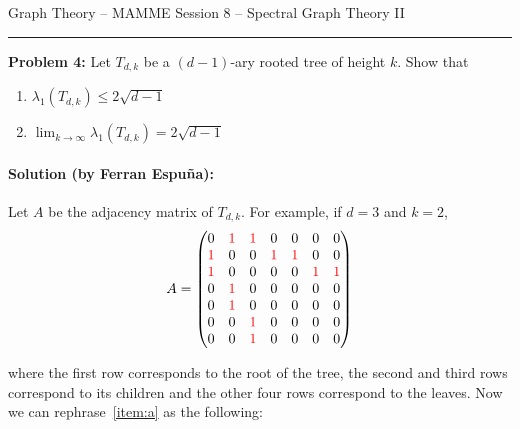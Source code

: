 \documentclass{amsart}
\theoremstyle{plain}
\theoremstyle{definition}
\begin{document}
    {\Large Graph Theory -- MAMME}
    {\Large Session 8 -- Spectral Graph Theory II}

    \vspace{0.5cm}

    \hrule

    \vspace{0.5cm}

    \noindent \textbf{Problem 4:}
    Let $T_{d, k}$ be a $(d-1)$-ary rooted tree of height $k$.
    Show that

    \begin{enumerate}[label=(\alph*)]
        \item $\lambda_1(T_{d, k}) \leq 2 \sqrt{d - 1}$ \label{item:a}
        \item $\lim_{k \to \infty} \lambda_1(T_{d, k}) = 2 \sqrt{d - 1}$ \label{item:b}
    \end{enumerate}


    \paragraph{\textbf{Solution (by Ferran Espuña):}}
    Let $A$ be the adjacency matrix of $T_{d, k}$.
    For example, if $d = 3$ and $k = 2$,
    \[A = \begin{pmatrix}
        0  & \color{red} 1  & \color{red} 1  &  0  &  0  &  0  &  0 \\
        \color{red} 1  &  0  &  0  & \color{red} 1  & \color{red} 1  &  0  &  0 \\
        \color{red} 1  &  0  &  0  &  0  &  0  & \color{red} 1  & \color{red} 1 \\
        0  & \color{red} 1  &  0  &  0  &  0  &  0  &  0 \\
        0  & \color{red} 1  &  0  &  0  &  0  &  0  &  0 \\
        0  &  0  & \color{red} 1  &  0  &  0  &  0  &  0 \\
        0  &  0  & \color{red} 1  &  0  &  0  &  0  &  0
    \end{pmatrix}
    \]

    where the first row corresponds to the root of the tree,
    the second and third rows correspond to its children and the other four rows correspond to the leaves.
    Now we can rephrase~\ref{item:a} as the following:
\end{document}
